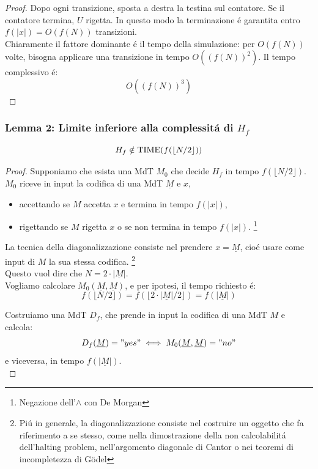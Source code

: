\begin{proof}
Dopo ogni transizione, sposta a destra la testina sul contatore. 
Se il contatore termina, $U$ rigetta.
In questo modo la terminazione é garantita entro $f(|x|) = O(f(N))$ transizioni.\\

Chiaramente il fattore dominante é il tempo della simulazione: 
per $O(f(N))$ volte, bisogna applicare una transizione in tempo $O((f(N))^2)$. 
Il tempo complessivo é:
\[O((f(N))^3)\]
\end{proof}

\newpage
\subsubsection{Lemma 2: Limite inferiore alla complessitá di $H_f$}
\[H_f \notin \text{TIME}(f(\lfloor N/2 \rfloor))\]
\begin{proof}
Supponiamo che esista una MdT $M_0$ che decide $H_f$ in tempo $f(\lfloor N/2 \rfloor)$. \\
$M_0$ riceve in input la codifica di una MdT $\underline{M}$ e $x$,
\begin{itemize}
    \item accettando se $M$ accetta $x$ e termina in tempo $f(|x|)$,
    \item rigettando se $M$ rigetta $x$ o se non termina in tempo $f(|x|)$. 
        \footnote{Negazione dell'$\land$ con De Morgan}
\end{itemize}

La tecnica della diagonalizzazione consiste nel prendere $x = \underline{M}$, 
cioé usare come input di $M$ la sua stessa codifica. 
\footnote{Piú in generale, la diagonalizzazione consiste nel costruire un oggetto che fa riferimento a se stesso, come nella dimostrazione della non calcolabilitá dell'halting problem, nell'argomento diagonale di Cantor o nei teoremi di incompletezza di Gödel} \\
Questo vuol dire che $N = 2 \cdot |\underline{M}|$. \\

Vogliamo calcolare $M_0(\underline{M}, \underline{M})$, e per ipotesi, il tempo richiesto é:
\[f(\lfloor N/2 \rfloor) = f(\lfloor 2 \cdot |\underline{M}|/2 \rfloor) = f( |\underline{M}| )\]

Costruiamo una MdT $D_f$, che prende in input la codifica di una MdT $M$
e calcola: 
\[D_f(\underline{M}) = "yes" \iff M_0(\underline{M}, \underline{M}) = "no"\] 
e viceversa, in tempo $f(|\underline{M}|)$. \\


\end{proof}
